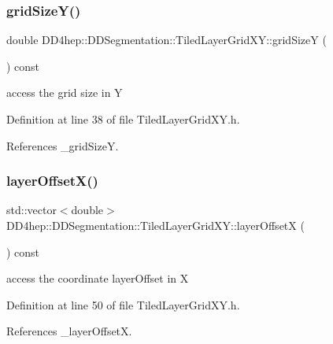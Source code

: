 \subsubsection{\texorpdfstring{grid\+Size\+Y()}{gridSizeY()}}
{\footnotesize\ttfamily double D\+D4hep\+::\+D\+D\+Segmentation\+::\+Tiled\+Layer\+Grid\+X\+Y\+::grid\+SizeY (\begin{DoxyParamCaption}{ }\end{DoxyParamCaption}) const\hspace{0.3cm}{\ttfamily [inline]}}



access the grid size in Y 



Definition at line 38 of file Tiled\+Layer\+Grid\+X\+Y.\+h.



References \+\_\+grid\+SizeY.

\hypertarget{class_d_d4hep_1_1_d_d_segmentation_1_1_tiled_layer_grid_x_y_ab799c0cf8e676a4849ca96eb8d0b2619}{}\label{class_d_d4hep_1_1_d_d_segmentation_1_1_tiled_layer_grid_x_y_ab799c0cf8e676a4849ca96eb8d0b2619} 
\subsubsection{\texorpdfstring{layer\+Offset\+X()}{layerOffsetX()}}
{\footnotesize\ttfamily std\+::vector$<$double$>$ D\+D4hep\+::\+D\+D\+Segmentation\+::\+Tiled\+Layer\+Grid\+X\+Y\+::layer\+OffsetX (\begin{DoxyParamCaption}{ }\end{DoxyParamCaption}) const\hspace{0.3cm}{\ttfamily [inline]}}



access the coordinate layer\+Offset in X 



Definition at line 50 of file Tiled\+Layer\+Grid\+X\+Y.\+h.



References \+\_\+layer\+OffsetX.

\hypertarget{class_d_d4hep_1_1_d_d_segmentation_1_1_tiled_layer_grid_x_y_a61e4d16f23c1069f3b22c8a7838640f9}{}\label{class_d_d4hep_1_1_d_d_segmentation_1_1_tiled_layer_grid_x_y_a61e4d16f23c1069f3b22c8a7838640f9} 

